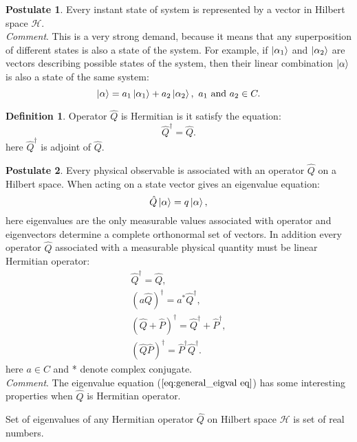 \documentclass[twoside,english]{uiofysmaster}
\theoremstyle{definition}
\newtheorem{defn}{Definition}
\newtheorem{post}{Postulate}
\begin{document}
\begin{post}
	Every instant state of system is represented by a vector in Hilbert space $\mathscr{H}$.\\
\textit{Comment}. This is a very strong demand, because it means that any superposition of different states is also a state of the system. For example, if $\ket{\alpha_1}$ and  $\ket{\alpha_2}$ are vectors describing possible states of the system, then their linear combination $\ket{\alpha}$ is also a state of the same system:
\begin{equation*}
\ket{\alpha}=a_1\ket{\alpha_1}+a_2\ket{\alpha_2}, \text{   } a_1\text{  and }  a_2 \in C.
\end{equation*}
\end{post}
\begin{defn}
Operator $\hat{Q}$ is Hermitian is it satisfy the equation:
\begin{equation}
\hat{Q}^\dagger=\hat{Q}.
\end{equation}
here $\hat{Q}^\dagger$ is adjoint of $\hat{Q}$.
\end{defn}
\begin{post}\label{postulat2}
	Every physical observable is associated with an operator $\hat{Q}$ on a Hilbert space. When acting on a state vector gives an eigenvalue equation:
	\begin{equation}\label{eq:general_eigval eq}
	\hat{Q}\ket{\alpha}= q\ket{\alpha}, 
	\end{equation}
here eigenvalues are the only measurable values associated with operator and eigenvectors determine a complete orthonormal set of vectors. In addition every operator $\hat{Q}$ associated with a measurable physical quantity must be linear Hermitian operator:
	\begin{align}
	\hat{Q}^\dagger=\hat{Q},\\
	(a\hat{Q})^\dagger=a^*\hat{Q}^\dagger,\\
	(\hat{Q}+\hat{P})^\dagger =\hat{Q}^\dagger+\hat{P}^\dagger,\\
	(\hat{Q}\hat{P})^\dagger =\hat{P}^\dagger \hat{Q}^\dagger.
	\end{align}
	here $a \in C$ and * denote complex conjugate.\\
\textit{Comment}. The eigenvalue equation ($\ref{eq:general_eigval eq}$) has some interesting properties when $\hat{Q}$ is Hermitian operator. 
\end{post}

\begin{theorem}
	Set of eigenvalues of any Hermitian operator $\hat{Q}$ on Hilbert space $\mathscr{H}$ is set of real numbers. 
\end{theorem}
\end{document}
